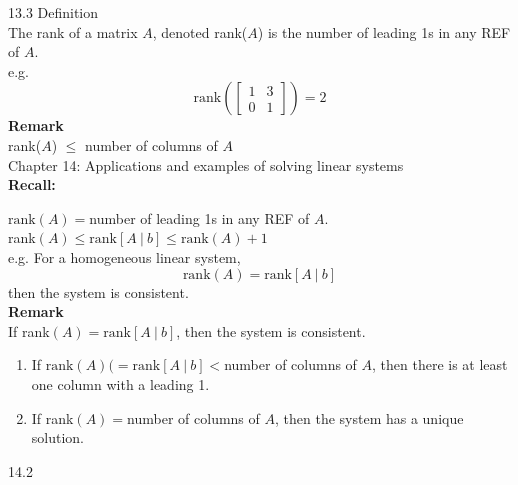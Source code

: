 \documentclass[]{article}
\begin{document}
		\large{13.3 Definition}\\
		\normalsize
		The rank of a matrix $A$, denoted rank($A$) is the number of leading 1s in any REF of $A$.\\
		e.g.
		$$
			\text{rank}\left(\begin{bmatrix}{1}&{3}\\{0}&{1}\end{bmatrix}\right)=2
		$$
		{\bf Remark}\\
		rank($A$) $\le$ number of columns of $A$
		\pagebreak\\
		\Large{Chapter 14: Applications and examples of
                  solving linear systems}\\
                \normalsize
                {\bf Recall:}

                $\text{rank}(A)=$number of leading 1s in any REF of
                $A$.\\
                rank$(A)\le\text{rank}[A~|~b]\le\text{rank}(A)+1$\\
                e.g. For a homogeneous linear system,
                $$
                \text{rank}(A)=\text{rank}[A~|~b]
                $$
                then the system is consistent.\\
                {\bf Remark}\\
                If rank$(A)=\text{rank}[A~|~b]$, then the system is
                consistent.
                \begin{enumerate}
                  \item If $\text{rank}(A)(=\text{rank}[A~|~b]<$number
                    of columns of $A$, then there is at least one
                    column with a leading 1.
                  \item If rank$(A)=$number of columns of $A$, then
                    the system has a unique solution. 
                \end{enumerate}
                \large{14.2}\\
                \normalsize
\end{document}
